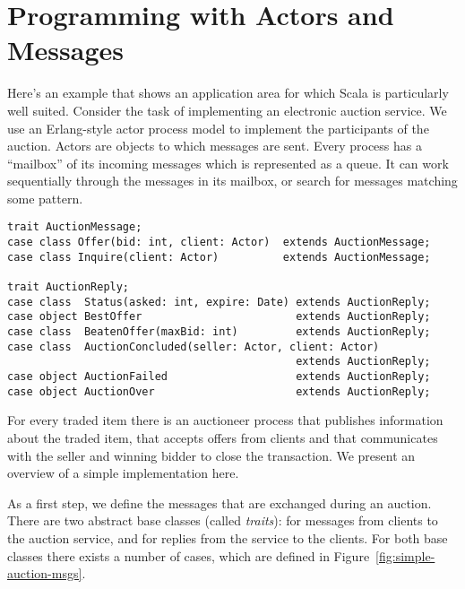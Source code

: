 \chapter{Programming with Actors and Messages}
\label{chap:example-auction}

Here's an example that shows an application area for which Scala is
particularly well suited. Consider the task of implementing an
electronic auction service. We use an Erlang-style actor process
model to implement the participants of the auction. Actors are
objects to which messages are sent. Every process has a ``mailbox'' of
its incoming messages which is represented as a queue. It can work
sequentially through the messages in its mailbox, or search for
messages matching some pattern.

\begin{lstlisting}[style=floating,label=fig:simple-auction-msgs,caption=Implementation of an Auction Service]
trait AuctionMessage;
case class Offer(bid: int, client: Actor)  extends AuctionMessage;
case class Inquire(client: Actor)          extends AuctionMessage;       

trait AuctionReply;
case class  Status(asked: int, expire: Date) extends AuctionReply;
case object BestOffer                        extends AuctionReply;
case class  BeatenOffer(maxBid: int)         extends AuctionReply;
case class  AuctionConcluded(seller: Actor, client: Actor) 
                                             extends AuctionReply;
case object AuctionFailed                    extends AuctionReply;
case object AuctionOver                      extends AuctionReply;
\end{lstlisting}

For every traded item there is an auctioneer process that publishes
information about the traded item, that accepts offers from clients
and that communicates with the seller and winning bidder to close the
transaction. We present an overview of a simple implementation
here.

As a first step, we define the messages that are exchanged during an
auction. There are two abstract base classes (called {\em traits}):
 for messages from clients to the auction
service, and  for replies from the service to the
clients.  For both base classes there exists a number of cases, which
are defined in Figure~\ref{fig:simple-auction-msgs}.

